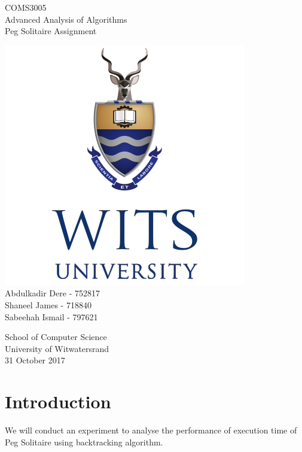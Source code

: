 \documentclass{article}
\begin{document}
\begin{titlepage}
    \begin{center}
        \vspace*{1cm}
        \huge COMS3005\\
        \huge Advanced Analysis of Algorithms \\
        \LARGE Peg Solitaire Assignment
        
		\vspace{1.5cm}        
		
		\includegraphics[scale=0.5]{witsLogo.png} \\		
		\vspace{1.5cm}
        \large Abdulkadir Dere - 752817\\
        Shaneel James - 718840 \\
        Sabeehah Ismail - 797621\\
        
		\vspace{1.5cm} 
		       
                
        School of Computer Science\\
        University of Witwatersrand\\
        31 October 2017
        
    \end{center}
\end{titlepage}

\tableofcontents
\newpage
\section{Introduction}
We will conduct an experiment to analyse the performance of execution time of Peg Solitaire using backtracking algorithm. 
\end{document}
